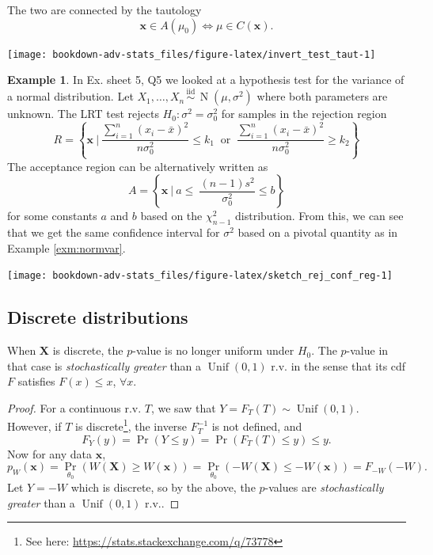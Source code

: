 \documentclass[
]{book}
\newcommand{\bx}{{\boldsymbol x}}
\newcommand{\bX}{{\boldsymbol X}}
\DeclareMathOperator{\N}{N}
\DeclareMathOperator{\Unif}{Unif}
\newcommand{\iid}{\,\overset{\text{iid}}{\sim}\,}
\theoremstyle{definition}
\theoremstyle{definition}
\newtheorem{example}{Example}[chapter]
\theoremstyle{definition}
\theoremstyle{definition}
\theoremstyle{remark}
\begin{document}
The two are connected by the tautology
\[
\bx \in A(\mu_0) \Leftrightarrow \mu \in C(\bx).
\]

\begin{center}\texttt{[image: bookdown-adv-stats\_files/figure-latex/invert\_test\_taut-1]} \end{center}

\begin{example}
In Ex. sheet 5, Q5 we looked at a hypothesis test for the variance of a normal distribution.
Let \(X_1,\dots,X_n\iid\N(\mu,\sigma^2)\) where both parameters are unknown.
The LRT test rejects \(H_0:\sigma^2=\sigma_0^2\) for samples in the rejection region
\[
R = \left\{\bx \ \bigg| \ \frac{\sum_{i=1}^n (x_i-\bar x)^2}{n\sigma_0^2} \leq k_1 \ \text{ or } \ \frac{\sum_{i=1}^n (x_i-\bar x)^2}{n\sigma_0^2} \geq k_2\right\}
\]
The acceptance region can be alternatively written as
\[
A = \left\{\bx \ \bigg| \ a \leq \ \frac{(n-1)s^2}{\sigma_0^2} \leq b\right\}
\]
for some constants \(a\) and \(b\) based on the \(\chi^2_{n-1}\) distribution. From this, we can see that we get the same confidence interval for \(\sigma^2\) based on a pivotal quantity as in Example \ref{exm:normvar}.
\end{example}

\begin{center}\texttt{[image: bookdown-adv-stats\_files/figure-latex/sketch\_rej\_conf\_reg-1]} \end{center}

\hypertarget{discrete-distributions}{%
\subsection{Discrete distributions}\label{discrete-distributions}}

When \(\bX\) is discrete, the \(p\)-value is no longer uniform under \(H_0\).
The \(p\)-value in that case is \emph{stochastically greater} than a \(\Unif(0,1)\) r.v. in the sense that its cdf \(F\) satisfies \(F(x)\leq x\), \(\forall x\).

\begin{proof}
For a continuous r.v. \(T\), we saw that \(Y=F_T(T)\sim\Unif(0,1)\). However, if \(T\) is discrete\footnote{See here: \url{https://stats.stackexchange.com/q/73778}}, the inverse \(F_T^{-1}\) is not defined, and
\[
F_Y(y) = \Pr(Y \leq y) = \Pr(F_T(T)\leq y) \leq y.
\]
Now for any data \(\bx\),
\[
p_W(\bx) = \Pr_{\theta_0}(W(\bX)\geq W(\bx)) = \Pr_{\theta_0}(-W(\bX)\leq -W(\bx))=F_{-W}(-W).
\]
Let \(Y=-W\) which is discrete, so by the above, the \(p\)-values are \emph{stochastically greater} than a \(\Unif(0,1)\) r.v..
\end{proof}
\end{document}
